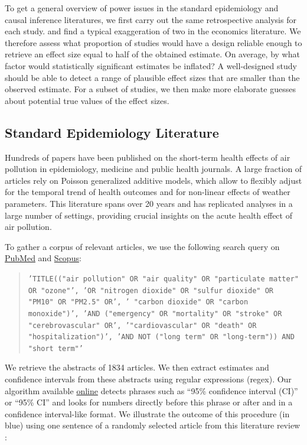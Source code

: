 \documentclass[12pt]{article}
\begin{document}
     To get a general overview of power issues in the standard epidemiology and causal inference literatures, we first carry out the same retrospective analysis for each study. \cite{ioannidis_power_2017} and \citep{ferraro_featureis_2020} find a typical exaggeration of two in the economics literature. We therefore assess what proportion of studies would have a design reliable enough to retrieve an effect size equal to half of the obtained estimate. On average, by what factor would statistically significant estimates be inflated? A well-designed study should be able to detect a range of plausible effect sizes that are smaller than the observed estimate. For a subset of studies, we then make more elaborate guesses about potential true values of the effect sizes. 
 
    
    \subsection{Standard Epidemiology Literature}
    
        Hundreds of papers have been published on the short-term health effects of air pollution in epidemiology, medicine and public health journals. A large fraction of articles rely on Poisson generalized additive models, which allow to flexibly adjust for the temporal trend of health outcomes and for non-linear effects of weather parameters. This literature spans over 20 years and has replicated analyses in a large number of settings, providing crucial insights on the acute health effect of air pollution. 
    
        To gather a corpus of relevant articles, we use the following search query on \href{https://www.ncbi.nlm.nih.gov/}{PubMed} and \href{https://www.scopus.com/home.uri}{Scopus}:
               
        \begin{quote}
       \footnotesize\texttt{'TITLE(("air pollution" OR "air quality" OR "particulate matter" OR "ozone"', 'OR "nitrogen dioxide" OR "sulfur dioxide" OR "PM10" OR "PM2.5" OR', ' "carbon dioxide" OR "carbon monoxide")',  'AND ("emergency" OR "mortality" OR "stroke" OR "cerebrovascular" OR', '"cardiovascular" OR "death" OR "hospitalization")', 'AND NOT ("long term" OR "long-term")) AND "short term"'}
        \end{quote}

       \noindent We retrieve the abstracts of 1834 articles. We then extract estimates and confidence intervals from these abstracts using regular expressions (regex). Our algorithm available \href{https://vincentbagilet.github.io/inference_pollution/automatic_lit_review_getting_abstracts.html}{online} detects phrases such as “95\% confidence interval (CI)” or “95\% CI” and looks for numbers directly before this phrase or after and in a confidence interval-like format. We illustrate the outcome of this procedure (in blue) using one sentence of a randomly selected article from this literature review \citep{vichit-vadakan_public_2008}:
        
\end{document}
